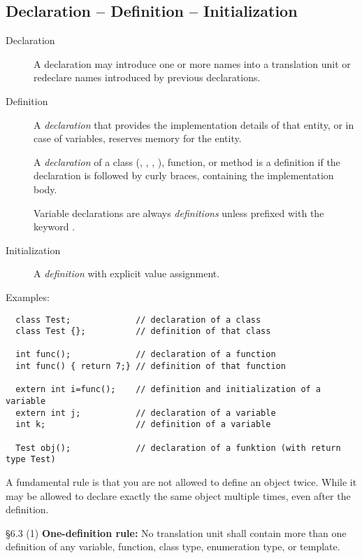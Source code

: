 \subsection{Declaration -- Definition -- Initialization}
\begin{description}
\item[Declaration] A declaration may introduce one or more names into a translation unit or redeclare names
  introduced by previous declarations.

\item[Definition] A \textit{declaration} that provides the implementation details of that entity, or in case of variables, reserves memory for
  the entity.

  A \textit{declaration} of a class (, , , ), function, or method is a definition if the declaration is
  followed by curly braces, containing the implementation body.

  Variable declarations are always \textit{definitions} unless prefixed with the keyword .

\item[Initialization] A \textit{definition} with explicit value assignment.
\end{description}

Examples:
\begin{verbatim}
  class Test;             // declaration of a class
  class Test {};          // definition of that class

  int func();             // declaration of a function
  int func() { return 7;} // definition of that function

  extern int i=func();    // definition and initialization of a variable
  extern int j;           // declaration of a variable
  int k;                  // definition of a variable

  Test obj();             // declaration of a funktion (with return type Test)
\end{verbatim}

A fundamental rule is that you are not allowed to define an object twice. While it may be allowed to declare exactly the same object multiple times, even after the definition.

\begin{standard}{\S 6.3 (1)}
  \textbf{One-definition rule:} No translation unit shall contain more than one definition of any variable, function, class type, enumeration
  type, or template.
\end{standard}


